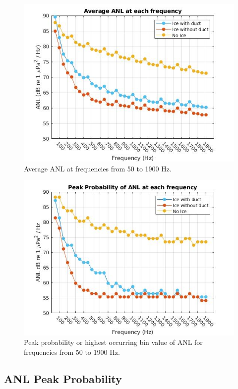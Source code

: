 \begin{figure}[p]
\centering
\includegraphics[scale=0.6]{Figures/Average_ANL.jpg}
\caption{Average ANL at frequencies from 50 to 1900 Hz.}
\label{fig_avg_anl}
\end{figure}

\begin{figure}[p]
\centering
\includegraphics[scale=0.6]{Figures/peak_prob_ANL.jpg}
\caption{Peak probability or highest occurring bin value of ANL for frequencies from 50 to 1900 Hz.}
\label{fig_peak_prob}
\end{figure}

\subsection{ANL Peak Probability} \label{sec_peak_prob}

